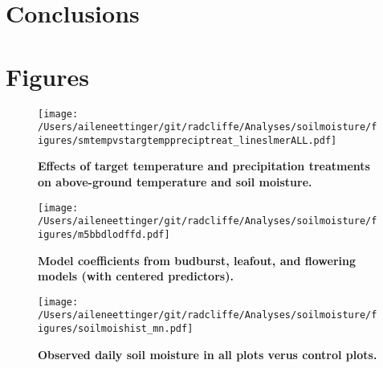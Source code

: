 \documentclass{article}
\begin{document}
\section* {Conclusions}



\clearpage
\section* {Figures}
\clearpage
 \begin{figure}[h]
\centering
 \texttt{[image: /Users/aileneettinger/git/radcliffe/Analyses/soilmoisture/figures/smtempvstargtemppreciptreat\_lineslmerALL.pdf]}
 \caption{\textbf{Effects of target temperature and precipitation treatments on above-ground temperature and soil moisture.}} 
 \label{fig:soilmois}
 \end{figure}

\begin{figure}[h]
\centering
 \texttt{[image: /Users/aileneettinger/git/radcliffe/Analyses/soilmoisture/figures/m5bbdlodffd.pdf]}
 \caption{\textbf{Model coefficients from budburst, leafout, and flowering models (with centered predictors).}} 
 \label{fig:bb}
 \end{figure}

\begin{figure}[h]
\centering
 \texttt{[image: /Users/aileneettinger/git/radcliffe/Analyses/soilmoisture/figures/soilmoishist\_mn.pdf]}
 \caption{\textbf{Observed daily soil moisture in all plots verus control plots.}} 
 \label{fig:sm}
 \end{figure}


\end{document}
